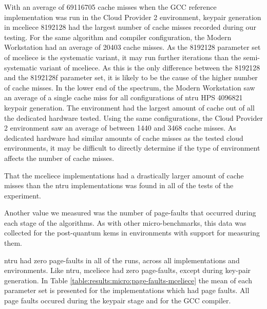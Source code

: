 

With an average of 69116705 cache misses when the GCC reference implementation was run in the Cloud Provider 2 environment, keypair generation in \gls{mceliece} 8192128 had the largest number of cache misses recorded during our testing. For the same algorithm and compiler configuration, the Modern Workstation had an average of 20403 cache misses. As the 8192128 parameter set of \gls{mceliece} is the systematic variant, it may run further iterations than the semi-systematic variant of \gls{mceliece}. As this is the only difference between the 8192128 and the 8192128f parameter set, it is likely to be the cause of the higher number of cache misses. In the lower end of the spectrum, the Modern Workstation saw an average of a single cache miss for all configurations of \gls{ntru} HPS 4096821 keypair generation. The environment had the largest amount of cache out of all the dedicated hardware tested. Using the same configurations, the Cloud Provider 2 environment saw an average of between 1440 and 3468 cache misses. As dedicated hardware had similar amounts of cache misses as the tested cloud environments, it may be difficult to directly determine if the type of environment affects the number of cache misses.

That the \gls{mceliece} implementations had a drastically larger amount of cache misses than the \gls{ntru} implementations was found in all of the tests of the experiment.

\noindent Another value we measured was the number of page-faults that occurred during each stage of the algorithms. As with other micro-benchmarks, this data was collected for the \gls{post-quantum} \glspl{kem} in environments with support for measuring them.

\gls{ntru} had zero page-faults in all of the runs, across all implementations and environments. Like \gls{ntru}, \gls{mceliece} had zero page-faults, except during key-pair generation. In Table \ref{table:results:micro:page-faults-mceliece} the mean of each parameter set is presented for the implementations which had page faults. All page faults occured during the keypair stage and for the GCC compiler.



